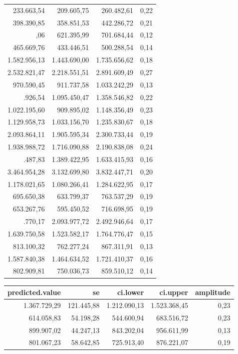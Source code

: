 \documentclass[a4paper]{article}
\begin{document}
\begin{table}
\begin{tabular}[t]{rrrr}
233.663,54 & 209.605,75 & 260.482,61 & 0,22\\
398.390,85 & 358.851,53 & 442.286,72 & 0,21\\
\addlinespace
660.321,06 & 621.395,99 & 701.684,44 & 0,12\\
465.669,76 & 433.446,51 & 500.288,54 & 0,14\\
1.582.956,13 & 1.443.690,00 & 1.735.656,62 & 0,18\\
2.532.821,47 & 2.218.551,51 & 2.891.609,49 & 0,27\\
970.590,45 & 911.737,58 & 1.033.242,29 & 0,13\\
\addlinespace
1.219.926,54 & 1.095.450,47 & 1.358.546,82 & 0,22\\
1.022.195,60 & 909.895,02 & 1.148.356,49 & 0,23\\
1.129.958,73 & 1.033.156,70 & 1.235.830,67 & 0,18\\
2.093.864,11 & 1.905.595,34 & 2.300.733,44 & 0,19\\
1.938.988,72 & 1.716.090,88 & 2.190.838,08 & 0,24\\
\addlinespace
1.506.487,83 & 1.389.422,95 & 1.633.415,93 & 0,16\\
3.464.954,28 & 3.132.699,80 & 3.832.447,71 & 0,20\\
1.178.021,65 & 1.080.266,41 & 1.284.622,95 & 0,17\\
695.650,38 & 633.799,37 & 763.537,29 & 0,19\\
653.267,76 & 595.450,52 & 716.698,95 & 0,19\\
\addlinespace
2.284.770,17 & 2.093.977,72 & 2.492.946,64 & 0,17\\
1.639.750,58 & 1.523.582,17 & 1.764.776,47 & 0,15\\
813.100,32 & 762.277,24 & 867.311,91 & 0,13\\
1.587.840,38 & 1.464.634,52 & 1.721.410,37 & 0,16\\
802.909,81 & 750.036,73 & 859.510,12 & 0,14\\
\bottomrule
\end{tabular}
\centering
\begin{tabular}[t]{rrrrr}
\toprule
predicted.value & se & ci.lower & ci.upper & amplitude\\
\midrule
1.367.729,29 & 121.445,88 & 1.212.090,13 & 1.523.368,45 & 0,23\\
614.058,83 & 54.198,28 & 544.600,94 & 683.516,72 & 0,23\\
899.907,02 & 44.247,13 & 843.202,04 & 956.611,99 & 0,13\\
801.067,23 & 58.642,85 & 725.913,40 & 876.221,07 & 0,19\\

\end{tabular}
\end{table}
\end{document}
